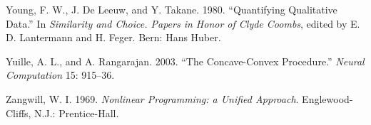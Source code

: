 \documentclass[
  12pt,
]{article}
\newlength{\cslhangindent}
\newenvironment{CSLReferences}[2] %
 {\begin{list}{}{%
  \setlength{\itemindent}{0pt}
  \setlength{\leftmargin}{0pt}
  \setlength{\parsep}{0pt}
  \ifodd #1
   \setlength{\leftmargin}{\cslhangindent}
   \setlength{\itemindent}{-1\cslhangindent}
  \fi
  \setlength{\itemsep}{#2\baselineskip}}}
 {\end{list}}
\begin{document}
\begin{CSLReferences}{1}{0}
Young, F. W., J. De Leeuw, and Y. Takane. 1980. {``Quantifying Qualitative Data.''} In \emph{Similarity and Choice. Papers in Honor of Clyde Coombs}, edited by E. D. Lantermann and H. Feger. Bern: Hans Huber.

Yuille, A. L., and A. Rangarajan. 2003. {``{The Concave-Convex Procedure}.''} \emph{Neural Computation} 15: 915--36.

Zangwill, W. I. 1969. \emph{{Nonlinear Programming: a Unified Approach}}. Englewood-Cliffs, N.J.: Prentice-Hall.

\end{CSLReferences}
\end{document}

